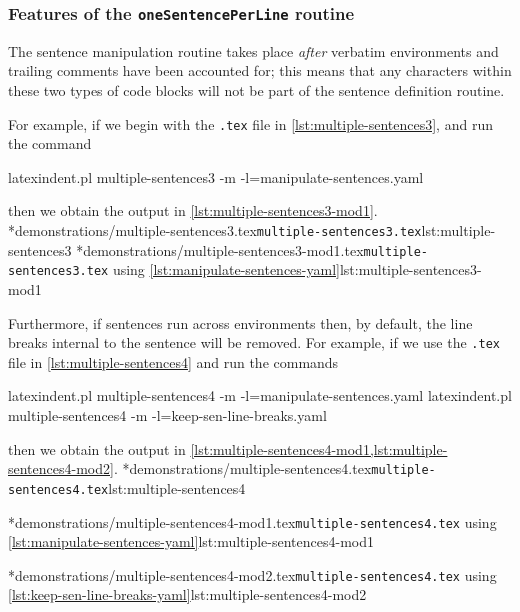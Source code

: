 \subsubsection{Features of the \texttt{oneSentencePerLine} routine}
	The sentence manipulation routine takes place \emph{after} verbatim environments and trailing comments have been accounted for; this means that any characters within these two types of code blocks will not be part of the sentence definition routine.

	For example, if we begin with the \texttt{.tex} file in \cref{lst:multiple-sentences3}, and run the command \begin{commandshell}
latexindent.pl multiple-sentences3 -m -l=manipulate-sentences.yaml
	\end{commandshell} then we obtain the output in \cref{lst:multiple-sentences3-mod1}.
	\cmhlistingsfromfile*[showspaces=false]*{demonstrations/multiple-sentences3.tex}{\texttt{multiple-sentences3.tex}}{lst:multiple-sentences3}
	\cmhlistingsfromfile*[showspaces=false]*{demonstrations/multiple-sentences3-mod1.tex}{\texttt{multiple-sentences3.tex} using \vref{lst:manipulate-sentences-yaml}}{lst:multiple-sentences3-mod1}

	Furthermore, if sentences run across environments then, by default, the line breaks internal to the sentence will be removed.
	For example, if we use the \texttt{.tex} file in \cref{lst:multiple-sentences4} and run the commands \begin{commandshell}
latexindent.pl multiple-sentences4 -m -l=manipulate-sentences.yaml
latexindent.pl multiple-sentences4 -m -l=keep-sen-line-breaks.yaml
	\end{commandshell} then we obtain the output in \cref{lst:multiple-sentences4-mod1,lst:multiple-sentences4-mod2}.
	\cmhlistingsfromfile*[showspaces=false]*{demonstrations/multiple-sentences4.tex}{\texttt{multiple-sentences4.tex}}{lst:multiple-sentences4}
	\begin{widepage}
		\cmhlistingsfromfile*[showspaces=false]*{demonstrations/multiple-sentences4-mod1.tex}{\texttt{multiple-sentences4.tex} using \vref{lst:manipulate-sentences-yaml}}{lst:multiple-sentences4-mod1}
	\end{widepage}
	\cmhlistingsfromfile*[showspaces=false]*{demonstrations/multiple-sentences4-mod2.tex}{\texttt{multiple-sentences4.tex} using \vref{lst:keep-sen-line-breaks-yaml}}{lst:multiple-sentences4-mod2}
